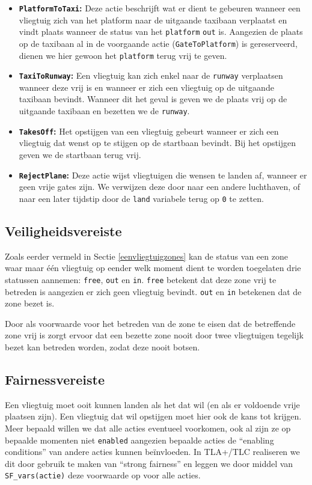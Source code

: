 \begin{itemize}
\item \textbf{\texttt{PlatformToTaxi}:} Deze actie beschrijft wat er dient te gebeuren wanneer een vliegtuig zich van het platform naar de uitgaande taxibaan verplaatst en vindt plaats wanneer de status van het \texttt{platform} \texttt{out} is. Aangezien de plaats op de taxibaan al in de voorgaande actie (\texttt{GateToPlatform}) is gereserveerd, dienen we hier gewoon het \texttt{platform} terug vrij te geven.
\item \textbf{\texttt{TaxiToRunway}:} Een vliegtuig kan zich enkel naar de \texttt{runway} verplaatsen wanneer deze vrij is en wanneer er zich een vliegtuig op de uitgaande taxibaan bevindt. Wanneer dit het geval is geven we de plaats vrij op de uitgaande taxibaan en bezetten we de \texttt{runway}.
\item \textbf{\texttt{TakesOff}:} Het opstijgen van een vliegtuig gebeurt wanneer er zich een vliegtuig dat wenst op te stijgen op de startbaan bevindt. Bij het opstijgen geven we de startbaan terug vrij.
\item \textbf{\texttt{RejectPlane}:} Deze actie wijst vliegtuigen die wensen te landen af, wanneer er geen vrije gates zijn. We verwijzen deze door naar een andere luchthaven, of naar een later tijdstip door de \texttt{land} variabele terug op \texttt{0} te zetten.
\end{itemize}

\subsection{Veiligheidsvereiste}
Zoals eerder vermeld in Sectie \ref{eenvliegtuigzones} kan de status van een zone waar maar één vliegtuig op eender welk moment dient te worden toegelaten drie statussen aannemen: \texttt{free}, \texttt{out} en \texttt{in}. \texttt{free} betekent dat deze zone vrij te betreden is aangezien er zich geen vliegtuig bevindt. \texttt{out} en \texttt{in} betekenen dat de zone bezet is. 

Door als voorwaarde voor het betreden van de zone te eisen dat de betreffende zone vrij is zorgt ervoor dat een bezette zone nooit door twee vliegtuigen tegelijk bezet kan betreden worden, zodat deze nooit botsen.

\subsection{Fairnessvereiste}
Een vliegtuig moet ooit kunnen landen als het dat wil (en als er voldoende vrije plaatsen zijn). Een vliegtuig dat wil opstijgen moet hier ook de kans tot krijgen. Meer bepaald willen we dat alle acties eventueel voorkomen, ook al zijn ze op bepaalde momenten niet \texttt{enabled} aangezien bepaalde acties de ``enabling conditions'' van andere acties kunnen beïnvloeden. In TLA+/TLC realiseren we dit door gebruik te maken van ``strong fairness'' en leggen we door middel van \texttt{SF\_vars(actie)} deze voorwaarde op voor alle acties.

